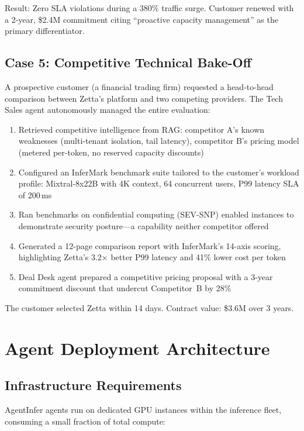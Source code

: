 \documentclass[conference,10pt,letterpaper]{IEEEtran}
\begin{document}
Result: Zero SLA violations during a 380\% traffic surge. Customer renewed with a 2-year, \$2.4M commitment citing ``proactive capacity management'' as the primary differentiator.

\subsection{Case 5: Competitive Technical Bake-Off}

A prospective customer (a financial trading firm) requested a head-to-head comparison between Zetta's platform and two competing providers. The Tech Sales agent autonomously managed the entire evaluation:

\begin{enumerate}
\item Retrieved competitive intelligence from RAG: competitor A's known weaknesses (multi-tenant isolation, tail latency), competitor B's pricing model (metered per-token, no reserved capacity discounts)
\item Configured an InferMark benchmark suite tailored to the customer's workload profile: Mixtral-8x22B with 4K context, 64 concurrent users, P99 latency SLA of 200\,ms
\item Ran benchmarks on confidential computing (SEV-SNP) enabled instances to demonstrate security posture---a capability neither competitor offered
\item Generated a 12-page comparison report with InferMark's 14-axis scoring, highlighting Zetta's 3.2$\times$ better P99 latency and 41\% lower cost per token
\item Deal Desk agent prepared a competitive pricing proposal with a 3-year commitment discount that undercut Competitor~B by 28\%
\end{enumerate}

The customer selected Zetta within 14 days. Contract value: \$3.6M over 3 years.


\section{Agent Deployment Architecture}
\label{sec:deploy}

\subsection{Infrastructure Requirements}

AgentInfer agents run on dedicated GPU instances within the inference fleet, consuming a small fraction of total compute:
\end{document}
